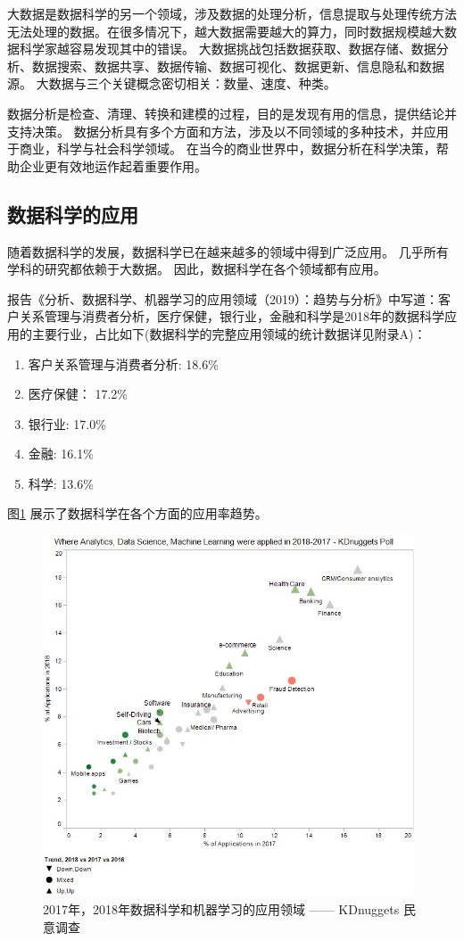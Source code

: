 \documentclass[a4paper, 11pt,twoside=true,UTF8]{scrartcl}
\begin{document}
大数据是数据科学的另一个领域，涉及数据的处理分析，信息提取与处理传统方法无法处理的数据。在很多情况下，越大数据需要越大的算力，同时数据规模越大数据科学家越容易发现其中的错误。 大数据挑战包括数据获取、数据存储、数据分析、数据搜索、数据共享、数据传输、数据可视化、数据更新、信息隐私和数据源。 大数据与三个关键概念密切相关：数量、速度、种类。

数据分析是检查、清理、转换和建模的过程，目的是发现有用的信息，提供结论并支持决策。 数据分析具有多个方面和方法，涉及以不同领域的多种技术，并应用于商业，科学与社会科学领域。  在当今的商业世界中，数据分析在科学决策，帮助企业更有效地运作起着重要作用。

\subsection{数据科学的应用}
\qquad 随着数据科学的发展，数据科学已在越来越多的领域中得到广泛应用。 几乎所有学科的研究都依赖于大数据。 因此，数据科学在各个领域都有应用。

报告《分析、数据科学、机器学习的应用领域（2019）：趋势与分析》中写道：客户关系管理与消费者分析，医疗保健，银行业，金融和科学是2018年的数据科学应用的主要行业，占比如下(数据科学的完整应用领域的统计数据详见附录A)：

\begin{enumerate}
	\item 客户关系管理与消费者分析: 18.6\%\\
	\item 医疗保健： 17.2\%\\
	\item 银行业: 17.0\%\\
	\item 金融: 16.1\%\\
	\item 科学: 13.6\%\\
\end{enumerate}

图\ref{P1F1} 展示了数据科学在各个方面的应用率趋势。
\begin{figure}[h]
	\small
	\centering
	\includegraphics[width=11cm]{P1F1}
	\caption{2017年，2018年数据科学和机器学习的应用领域 —— KDnuggets 民意调查} \label{P1F1}
\end{figure}
\end{document}
